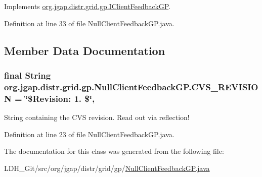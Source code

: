 Implements \hyperlink{interfaceorg_1_1jgap_1_1distr_1_1grid_1_1gp_1_1_i_client_feedback_g_p_af75a58ac732c3ccb08dc1b58b6b276ae}{org.\-jgap.\-distr.\-grid.\-gp.\-I\-Client\-Feedback\-G\-P}.



Definition at line 33 of file Null\-Client\-Feedback\-G\-P.\-java.



\subsection{Member Data Documentation}
\hypertarget{classorg_1_1jgap_1_1distr_1_1grid_1_1gp_1_1_null_client_feedback_g_p_a6bd53fd290f08e757626b6b54c8e4ce6}{
\subsubsection[{C\-V\-S\-\_\-\-R\-E\-V\-I\-S\-I\-O\-N}]{\setlength{\rightskip}{0pt plus 5cm}final String org.\-jgap.\-distr.\-grid.\-gp.\-Null\-Client\-Feedback\-G\-P.\-C\-V\-S\-\_\-\-R\-E\-V\-I\-S\-I\-O\-N = \char`\"{}\$Revision\-: 1. \$\char`\"{}\hspace{0.3cm}{\ttfamily [static]}, {\ttfamily [private]}}}\label{classorg_1_1jgap_1_1distr_1_1grid_1_1gp_1_1_null_client_feedback_g_p_a6bd53fd290f08e757626b6b54c8e4ce6}
String containing the C\-V\-S revision. Read out via reflection! 

Definition at line 23 of file Null\-Client\-Feedback\-G\-P.\-java.



The documentation for this class was generated from the following file\-:\begin{DoxyCompactItemize}
\item 
L\-D\-H\-\_\-\-Git/src/org/jgap/distr/grid/gp/\hyperlink{_null_client_feedback_g_p_8java}{Null\-Client\-Feedback\-G\-P.\-java}\end{DoxyCompactItemize}

